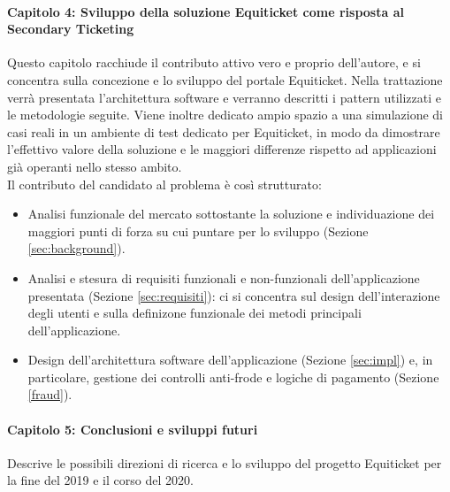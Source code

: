 \paragraph*{Capitolo 4: Sviluppo della soluzione Equiticket come risposta al Secondary Ticketing} 
Questo capitolo racchiude il contributo attivo vero e proprio dell'autore, e si concentra sulla concezione e lo sviluppo del portale Equiticket. Nella trattazione verrà presentata l'architettura software e verranno descritti i pattern utilizzati e le metodologie seguite. Viene inoltre dedicato ampio spazio a una simulazione di casi reali in un ambiente di test dedicato per Equiticket, in modo da dimostrare l'effettivo valore della soluzione e le maggiori differenze rispetto ad applicazioni già operanti nello stesso ambito. \\
Il contributo del candidato al problema è così strutturato: 
\begin{itemize}
\item Analisi funzionale del mercato sottostante la soluzione e individuazione dei maggiori punti di forza su cui puntare per lo sviluppo (Sezione \ref{sec:background}).
\item Analisi e stesura di requisiti funzionali e non-funzionali dell'applicazione presentata (Sezione \ref{sec:requisiti}): ci si concentra sul design dell'interazione degli utenti e sulla definizone funzionale dei metodi principali dell'applicazione. 
\item Design dell'architettura software dell'applicazione (Sezione \ref{sec:impl}) e, in particolare, gestione dei controlli anti-frode e logiche di pagamento (Sezione \ref{fraud}).
\end{itemize} 
\paragraph*{Capitolo 5: Conclusioni e sviluppi futuri} 
Descrive le possibili direzioni di ricerca e lo sviluppo del progetto Equiticket per la fine del 2019 e il corso del 2020. 